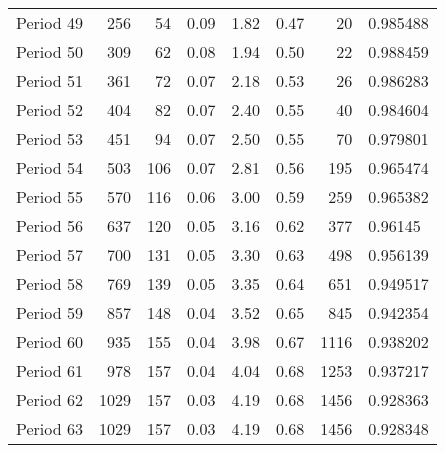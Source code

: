\begin{tabular}{lrrrrrrl}
Period 49 &                     256 &          54 &        0.09 &        1.82 &        0.47 &          20 &   0.985488 \\
Period 50 &                     309 &          62 &        0.08 &        1.94 &        0.50 &          22 &   0.988459 \\
Period 51 &                     361 &          72 &        0.07 &        2.18 &        0.53 &          26 &   0.986283 \\
Period 52 &                     404 &          82 &        0.07 &        2.40 &        0.55 &          40 &   0.984604 \\
Period 53 &                     451 &          94 &        0.07 &        2.50 &        0.55 &          70 &   0.979801 \\
Period 54 &                     503 &         106 &        0.07 &        2.81 &        0.56 &         195 &   0.965474 \\
Period 55 &                     570 &         116 &        0.06 &        3.00 &        0.59 &         259 &   0.965382 \\
Period 56 &                     637 &         120 &        0.05 &        3.16 &        0.62 &         377 &    0.96145 \\
Period 57 &                     700 &         131 &        0.05 &        3.30 &        0.63 &         498 &   0.956139 \\
Period 58 &                     769 &         139 &        0.05 &        3.35 &        0.64 &         651 &   0.949517 \\
Period 59 &                     857 &         148 &        0.04 &        3.52 &        0.65 &         845 &   0.942354 \\
Period 60 &                     935 &         155 &        0.04 &        3.98 &        0.67 &        1116 &   0.938202 \\
Period 61 &                     978 &         157 &        0.04 &        4.04 &        0.68 &        1253 &   0.937217 \\
Period 62 &                    1029 &         157 &        0.03 &        4.19 &        0.68 &        1456 &   0.928363 \\
Period 63 &                    1029 &         157 &        0.03 &        4.19 &        0.68 &        1456 &   0.928348 \\
\bottomrule
\end{tabular}
